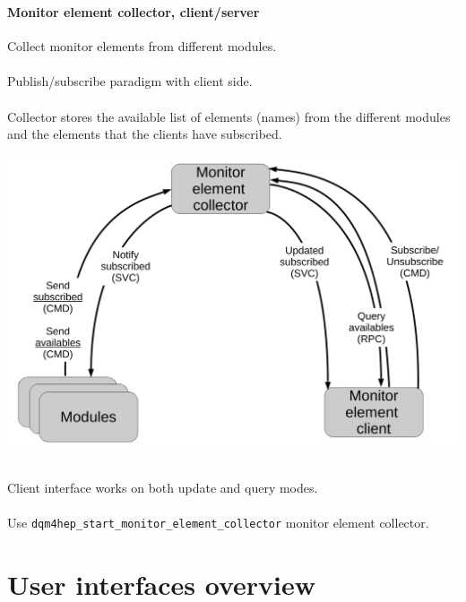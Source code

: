 \documentclass[8pt]{beamer}
\begin{document}
  \begin{frame}[containsverbatim]
    \frametitle{\secname}
    \framesubtitle{Monitor element collector, client/server}
    
    \begin{minipage}{0.43\textwidth}
      Collect monitor elements from different modules. \\
      ~ \\
      Publish/subscribe paradigm with client side. \\
      ~ \\
      Collector stores the available list of elements (names) from the different modules and the elements that the clients have subscribed.
    \end{minipage}
    \begin{minipage}{0.55\textwidth}
      \begin{center}
        \includegraphics[width=\textwidth]{figs/me_collector_arch.pdf}        
      \end{center}      
    \end{minipage}
    ~ 
    ~ \\
    Client interface works on both update and query modes. \\
    ~ \\
    Use \verb|dqm4hep_start_monitor_element_collector| monitor element collector.
     
  \end{frame}
  



    \section{User interfaces overview}
    
\end{document}
